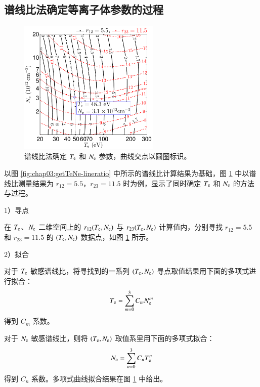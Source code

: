 \subsection{谱线比法确定等离子体参数的过程}

\begin{figure}
  \centering
  \includegraphics[width=0.6\textwidth]{5-9to7-7to5-getTeNe-crosspoint.pdf}
  \caption{谱线比法确定 $T_{\rm e}$ 和 $N_{\rm e}$ 参数，曲线交点以圆圈标识。}
  \label{fig:chap03:getTeNe-cross-pnt}
\end{figure}

以图 \ref{fig:chap03:getTeNe-lineratio} 中所示的谱线比计算结果为基础，图 \ref{fig:chap03:getTeNe-cross-pnt} 中以谱线比测量结果为 $r_{12}=5.5$，$r_{23}=11.5$ 时为例，显示了同时确定 $T_{\rm e}$ 和 $N_{\rm e}$ 的方法与过程。

1）寻点

在 $T_{\rm e}$、$N_{\rm e}$ 二维空间上的 $r_{12}(T_{\rm e},N_{\rm e})$ 与 $r_{23}(T_{\rm e},N_{\rm e})$ 计算值内，分别寻找 $r_{12}=5.5$ 和 $r_{23}=11.5$ 的 $(T_{\rm e}, N_{\rm e})$ 数据点，如图 \ref{fig:chap03:getTeNe-cross-pnt} 所示。

2）拟合

对于 $T_{\rm e}$ 敏感谱线比，将寻找到的一系列 $(T_{\rm e}, N_{\rm e})$ 寻点取值结果用下面的多项式进行拟合：
\begin{equation}
    \label{eq:chap03:getTeNe:r12-fit}
    T_{\rm e} = \sum_{m=0}^{3}C_{m}N_{\rm e}^{m}
\end{equation}
得到 $C_m$ 系数。

对于 $N_{\rm e}$ 敏感谱线比，则将 $(T_{\rm e}, N_{\rm e})$ 取值系里用下面的多项式拟合：
\begin{equation}
    \label{eq:chap03:getTeNe:r32-fit}
    N_{\rm e} = \sum_{n=0}^{3}C_{n}T_{\rm e}^{n}
\end{equation}
得到 $C_n$ 系数。多项式曲线拟合结果在图 \ref{fig:chap03:getTeNe-cross-pnt} 中给出。

